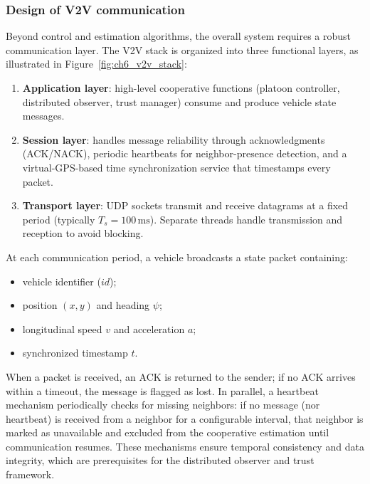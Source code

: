 \subsubsection{Design of V2V communication}\label{chp6_subsubsec_v2v_design}
Beyond control and estimation algorithms, the overall system requires a robust communication layer.
The V2V stack is organized into three functional layers, as illustrated in Figure~\ref{fig:ch6_v2v_stack}:
\begin{enumerate}
	\item \textbf{Application layer}: high-level cooperative functions (platoon controller, distributed observer, trust manager) consume and produce vehicle state messages.
	\item \textbf{Session layer}: handles message reliability through acknowledgments (ACK/NACK), periodic heartbeats for neighbor-presence detection, and a virtual-GPS-based time synchronization service that timestamps every packet.
	\item \textbf{Transport layer}: UDP sockets transmit and receive datagrams at a fixed period (typically $T_s = 100\,\mathrm{ms}$). Separate threads handle transmission and reception to avoid blocking.
\end{enumerate}

At each communication period, a vehicle broadcasts a state packet containing:
\begin{itemize}
	\item vehicle identifier ($id$);
	\item position $(x,y)$ and heading $\psi$;
	\item longitudinal speed $v$ and acceleration $a$;
	\item synchronized timestamp $t$.
\end{itemize}
When a packet is received, an ACK is returned to the sender; if no ACK arrives within a timeout, the message is flagged as lost.
In parallel, a heartbeat mechanism periodically checks for missing neighbors: if no message (nor heartbeat) is received from a neighbor for a configurable interval, that neighbor is marked as unavailable and excluded from the cooperative estimation until communication resumes.
These mechanisms ensure temporal consistency and data integrity, which are prerequisites for the distributed observer and trust framework.

